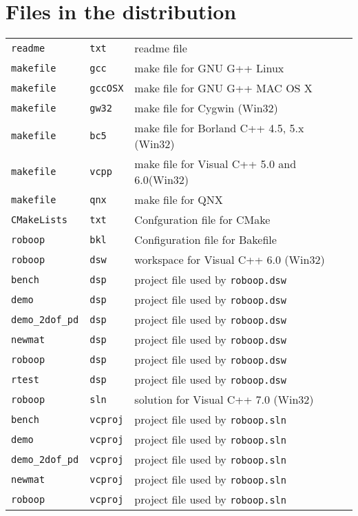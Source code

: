 \documentclass[11pt,fleqn,letterpaper]{report}
\begin{document}
\section{Files in the distribution}

{\small
\begin{tabular}{lll}
{\tt readme} & {\tt txt} & readme file \\
{\tt makefile} & {\tt gcc} & make file for GNU G++ Linux \\
{\tt makefile} & {\tt gccOSX} & make file for GNU G++ MAC OS X \\
{\tt makefile} & {\tt gw32} & make file for Cygwin (Win32)  \\
{\tt makefile} & {\tt bc5} & make file for Borland C++ 4.5, 5.x (Win32) \\
{\tt makefile} & {\tt vcpp} & make file for Visual C++ 5.0 and 6.0(Win32) \\
{\tt makefile} & {\tt qnx} & make file for QNX \\
{\tt CMakeLists} & {\tt txt} & Confguration file for CMake \\
{\tt roboop} & {\tt bkl} & Configuration file for Bakefile \\
{\tt roboop} & {\tt dsw} & workspace for Visual C++ 6.0 (Win32) \\
{\tt bench} & {\tt dsp} & project file used by \texttt{roboop.dsw} \\
{\tt demo} & {\tt dsp} & project file used by \texttt{roboop.dsw} \\
{\tt demo\_2dof\_pd} & {\tt dsp} & project file used by \texttt{roboop.dsw} \\
{\tt newmat} & {\tt dsp} & project file used by \texttt{roboop.dsw} \\
{\tt roboop} & {\tt dsp} & project file used by \texttt{roboop.dsw} \\
{\tt rtest} & {\tt dsp} & project file used by \texttt{roboop.dsw} \\
{\tt roboop} & {\tt sln} & solution for Visual C++ 7.0 (Win32) \\
{\tt bench} & {\tt vcproj} & project file used by \texttt{roboop.sln} \\
{\tt demo} & {\tt vcproj} & project file used by \texttt{roboop.sln} \\
{\tt demo\_2dof\_pd} & {\tt vcproj} & project file used by \texttt{roboop.sln} \\
{\tt newmat} & {\tt vcproj} & project file used by \texttt{roboop.sln} \\
{\tt roboop} & {\tt vcproj} & project file used by \texttt{roboop.sln} \\

\end{tabular}}
\end{document}
